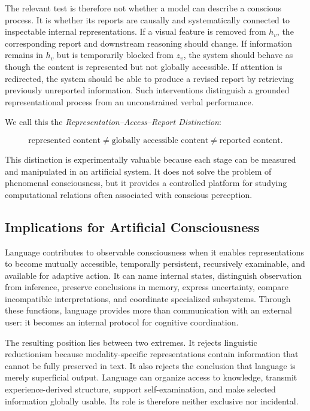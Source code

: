 The relevant test is therefore not whether a model can describe a conscious process. It is whether its reports are causally and systematically connected to inspectable internal representations. If a visual feature is removed from $h_v$, the corresponding report and downstream reasoning should change. If information remains in $h_v$ but is temporarily blocked from $z_v$, the system should behave as though the content is represented but not globally accessible. If attention is redirected, the system should be able to produce a revised report by retrieving previously unreported information. Such interventions distinguish a grounded representational process from an unconstrained verbal performance.

We call this the \emph{Representation--Access--Report Distinction}:

\begin{equation}
\text{represented content}
\neq
\text{globally accessible content}
\neq
\text{reported content}.
\label{eq:representation-access-report}
\end{equation}

This distinction is experimentally valuable because each stage can be measured and manipulated in an artificial system. It does not solve the problem of phenomenal consciousness, but it provides a controlled platform for studying computational relations often associated with conscious perception.

\subsection{Implications for Artificial Consciousness}
\label{subsec:language-consciousness-implications}

Language contributes to observable consciousness when it enables representations to become mutually accessible, temporally persistent, recursively examinable, and available for adaptive action. It can name internal states, distinguish observation from inference, preserve conclusions in memory, express uncertainty, compare incompatible interpretations, and coordinate specialized subsystems. Through these functions, language provides more than communication with an external user: it becomes an internal protocol for cognitive coordination.

The resulting position lies between two extremes. It rejects linguistic reductionism because modality-specific representations contain information that cannot be fully preserved in text. It also rejects the conclusion that language is merely superficial output. Language can organize access to knowledge, transmit experience-derived structure, support self-examination, and make selected information globally usable. Its role is therefore neither exclusive nor incidental.

